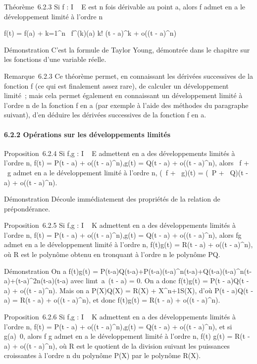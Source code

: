 Théorème~6.2.3 Si f : I \rightarrow~ E est n fois dérivable au point a, alors f
admet en a le développement limité à l'ordre n

f(t) = f(a) + \sum k=1^n~
f^(k)(a) \over k! (t - a)^k +
o((t - a)^n)

Démonstration C'est la formule de Taylor Young, démontrée dans le
chapitre sur les fonctions d'une variable réelle.

Remarque~6.2.3 Ce théorème permet, en connaissant les dérivées
successives de la fonction f (ce qui est finalement assez rare), de
calculer un développement limité~; mais cela permet également en
connaissant un développement limité à l'ordre n de la fonction f en a
(par exemple à l'aide des méthodes du paragraphe suivant), d'en déduire
les dérivées successives de la fonction f en a.

\paragraph{6.2.2 Opérations sur les développements limités}

Proposition~6.2.4 Si f,g : I \rightarrow~ E admettent en a des développements
limités à l'ordre n, f(t) = P(t - a) + o((t - a)^n),g(t) =
Q(t - a) + o((t - a)^n), alors \alpha~f + \beta~g admet en a le
développement limité à l'ordre n, (\alpha~f + \beta~g)(t) = (\alpha~P + \beta~Q)(t - a) +
o((t - a)^n).

Démonstration Découle immédiatement des propriétés de la relation de
prépondérance.

Proposition~6.2.5 Si f,g : I \rightarrow~ K admettent en a des développements
limités à l'ordre n, f(t) = P(t - a) + o((t - a)^n),g(t) =
Q(t - a) + o((t - a)^n), alors fg admet en a le développement
limité à l'ordre n, f(t)g(t) = R(t - a) + o((t - a)^n), où R
est le polynôme obtenu en tronquant à l'ordre n le polynôme PQ.

Démonstration On a f(t)g(t) =
P(t-a)Q(t-a)+P(t-a)(t-a)^n(t-a)+Q(t-a)(t-a)^n(t-a)+(t-a)^2n(t-a)(t-a)
avec limt\rightarrow~a\epsiloni~(t - a) = 0.
On a donc f(t)g(t) = P(t - a)Q(t - a) + o((t - a)^n). Mais on
a P(X)Q(X) = R(X) + X^n+1S(X), d'où P(t - a)Q(t - a) = R(t -
a) + o((t - a)^n), et donc f(t)g(t) = R(t - a) + o((t -
a)^n).

Proposition~6.2.6 Si f,g : I \rightarrow~ K admettent en a des développements
limités à l'ordre n, f(t) = P(t - a) + o((t - a)^n),g(t) =
Q(t - a) + o((t - a)^n), et si
g(a)\neq~0, alors  f \over g
admet en a le développement limité à l'ordre n,  f(t)
\over g(t) = R(t - a) + o((t - a)^n), où R
est le quotient de la division suivant les puissances croissantes à
l'ordre n du polynôme P(X) par le polynôme R(X).

